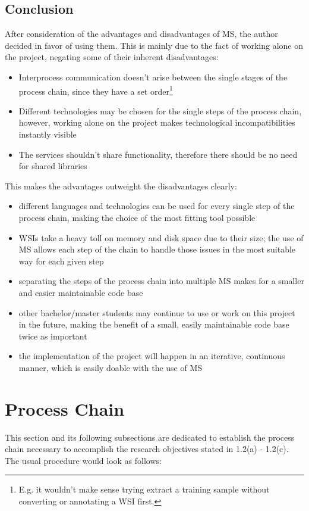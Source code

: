 \subsection{Conclusion}	
After consideration of the advantages and disadvantages of MS, the author decided in favor of using them. This is mainly due to the fact of working alone on the project, negating some of their inherent disadvantages:
\begin{itemize}
	\item Interprocess communication doesn't arise between the single stages of the process chain, since they have a set order\footnote{E.g. it wouldn't make sense trying extract a training sample without converting or annotating a WSI first.}
	\item Different technologies may be chosen for the single steps of the process chain, however, working alone on the project makes technological incompatibilities instantly visible
	\item The services shouldn't share functionality, therefore there should be no need for shared libraries
\end{itemize}
This makes the advantages outweight the disadvantages clearly:
\begin{itemize}
	\item different languages and technologies can be used for every single step of the process chain, making the choice of the most fitting tool possible
	\item WSIs take a heavy toll on memory and disk space due to their size; the use of MS allows each step of the chain to handle those issues in the most suitable way for each given step
	\item separating the steps of the process chain into multiple MS makes for a smaller and easier maintainable code base
	\item other bachelor/master students may continue to use or work on this project in the future, making the benefit of a small, easily maintainable code base twice as important
	\item the implementation of the project will happen in an iterative, continuous manner, which is easily doable with the use of MS
\end{itemize}


\section{Process Chain}
This section and its following subsections are dedicated to establish the process chain necessary to accomplish the research objectives stated in 1.2(a) - 1.2(c). The usual procedure would look as follows:

